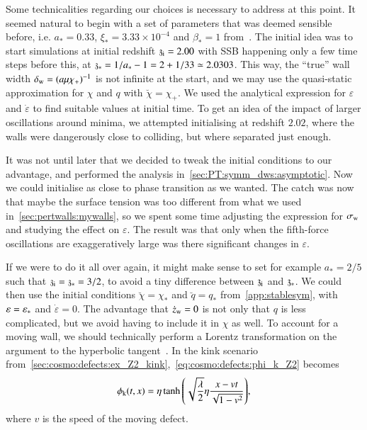 


Some technicalities regarding our choices is necessary to address at this point. %
It seemed natural to begin with a set of parameters that was deemed sensible before, i.e. $a_\ast = 0.33$, $\xi_\ast = 3.33\times 10^{-4}$ and $\beta_\ast = 1$ from~\citet{christiansenAsevolutionRelativisticNbody2023}. %
The initial idea was to start simulations at initial redshift $\mathfrak{z}_\mathrm{i}=2.00$ with SSB happening only a few time steps before this, at $\mathfrak{z}_\ast = 1/a_\ast - 1 = 2 + 1/33 \simeq 2.0303$. This way, the ``true'' wall width $\delta_\mathrm{w} = (a\mu\chi_+)^{-1}$ is not infinite at the start, and we may use the quasi-static approximation for $\chi$ and $q$ with $\breve{\chi}= \chi_+$. We used the analytical expression for $\varepsilon$ and $\dot{\varepsilon}$ to find suitable values at initial time. To get an idea of the impact of larger oscillations around minima, we attempted initialising at redshift $2.02$, where the walls were dangerously close to colliding, but where separated just enough. 



It was not until later that we decided to tweak the initial conditions to our advantage, and performed the analysis in~\cref{sec:PT:symm_dws:asymptotic}. Now we could initialise as close to phase transition as we wanted. The catch was now that maybe the surface tension was too different from what we used in~\cref{sec:pertwalls:mywalls}, so we spent some time adjusting the expression for $\sigma_\mathrm{w}$ and studying the effect on $\varepsilon$. The result was that only when the fifth-force oscillations are exaggeratively large was there significant changes in $\varepsilon$. 


If we were to do it all over again, it might make sense to set %
for example 
$a_\ast = 2/5$ such that $\mathfrak{z}_\mathrm{i}=\mathfrak{z}_\ast = 3/2$, 
to avoid a tiny difference between $\mathfrak{z}_\mathrm{i}$ and $\mathfrak{z}_\ast$. %
We could then use the initial conditions $\breve{\chi}=\chi_\ast$ and $\breve{q}=q_\ast$ from~\cref{app:stablesym}, with $\varepsilon=\varepsilon_\ast$ and $\dot{\varepsilon}=0$. %
The advantage that $\dot{z}_\mathrm{w}=0$ is not only that $q$ is less complicated, but we avoid having to include it in $\chi$ as well. To account for a moving wall, we should technically perform a Lorentz transformation on the argument to the hyperbolic tangent~\citep{vachaspatiKinksDomainWalls2006,blanco-pilladoDynamicsDomainWall2023}. In the kink scenario from~\cref{sec:cosmo:defects:ex_Z2_kink},~\cref{eq:cosmo:defects:phi_k_Z2} becomes~\citep{vachaspatiKinksDomainWalls2006}
\begin{equation}
    \phi_\mathrm{k}(t, x ) = \eta \tanh{{\left( \sqrt{\frac{\lambda}{2}}\eta  \frac{x - vt}{\sqrt{1-v^2}}  \right)}},
\end{equation}
where $v$ is the speed of the moving defect.

